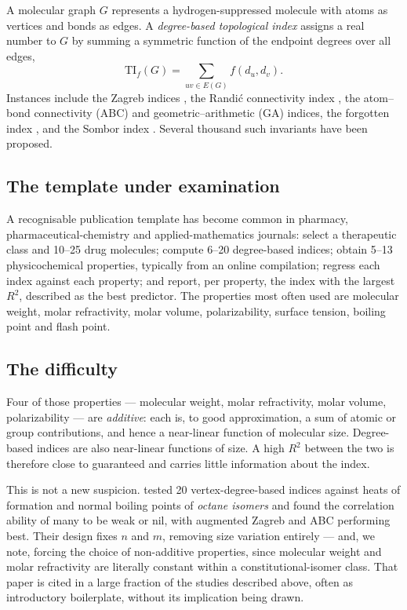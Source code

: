 \documentclass[11pt,a4paper]{article}
\theoremstyle{plain}
\newcommand{\TI}{\mathrm{TI}}
\begin{document}
A molecular graph $G$ represents a hydrogen-suppressed molecule with atoms as vertices and
bonds as edges. A \emph{degree-based topological index} assigns a real number to $G$ by
summing a symmetric function of the endpoint degrees over all edges,
\[
\TI_f(G)=\sum_{uv\in E(G)} f(d_u,d_v).
\]
Instances include the Zagreb indices \citep{gutman1972}, the Randi\'c connectivity index
\citep{randic1975}, the atom--bond connectivity (ABC) and geometric--arithmetic (GA)
indices, the forgotten index \citep{furtula2015}, and the Sombor index
\citep{gutman2021}. Several thousand such invariants have been proposed.

\subsection{The template under examination}

A recognisable publication template has become common in pharmacy,
pharmaceutical-chemistry and applied-mathematics journals: select a therapeutic class and
10--25 drug molecules; compute 6--20 degree-based indices; obtain 5--13 physicochemical
properties, typically from an online compilation; regress each index against each
property; and report, per property, the index with the largest $R^2$, described as the
best predictor. The properties most often used are molecular weight, molar refractivity,
molar volume, polarizability, surface tension, boiling point and flash point.

\subsection{The difficulty}

Four of those properties --- molecular weight, molar refractivity, molar volume,
polarizability --- are \emph{additive}: each is, to good approximation, a sum of atomic or
group contributions, and hence a near-linear function of molecular size. Degree-based
indices are also near-linear functions of size. A high $R^2$ between the two is therefore
close to guaranteed and carries little information about the index.

This is not a new suspicion. \citet{gutman2013} tested 20 vertex-degree-based indices
against heats of formation and normal boiling points of \emph{octane isomers} and found
the correlation ability of many to be weak or nil, with augmented Zagreb and ABC
performing best. Their design fixes $n$ and $m$, removing size variation entirely --- and,
we note, forcing the choice of non-additive properties, since molecular weight and molar
refractivity are literally constant within a constitutional-isomer class. That paper is
cited in a large fraction of the studies described above, often as introductory
boilerplate, without its implication being drawn.
\end{document}
